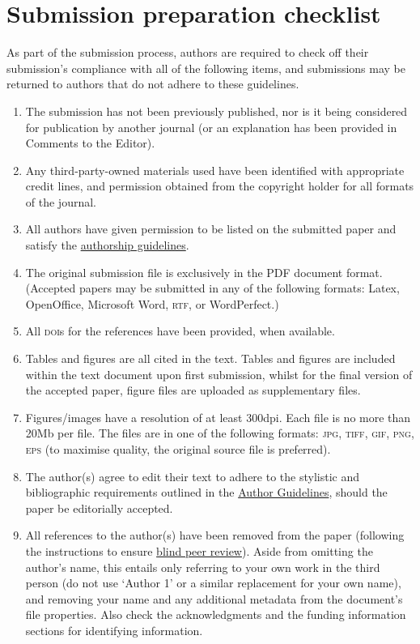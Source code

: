 \documentclass[charis,linguex]{glossa}
\begin{document}
\section{Submission preparation checklist}

As part of the submission process, authors are required to check off their submission's compliance with all of the following items, and submissions may be returned to authors that do not adhere to these guidelines.

\begin{enumerate}[label=\arabic*.]
\item The submission has not been previously published, nor is it being considered for publication by another journal (or an explanation has been provided in Comments to the Editor).
\item Any third-party-owned materials used have been identified with appropriate credit lines, and permission obtained from the copyright holder for all formats of the journal.
\item All authors have given permission to be listed on the submitted paper and satisfy the \href{http://glossa.ubiquitypress.com/about/authorship/}{authorship guidelines}. 
\item The original submission file is exclusively in the PDF document format. (Accepted papers may be submitted in any of the following formats: Latex, OpenOffice, Microsoft Word, \textsc{rtf}, or WordPerfect.)
\item All \textsc{doi}s for the references have been provided, when available.
\item Tables and figures are all cited in the text. Tables and figures are included within the text document upon first submission, whilst for the final version of the accepted paper, figure files are uploaded as supplementary files.
\item Figures/images have a resolution of at least 300dpi. Each file is no more than 20Mb per file. The files are in one of the following formats: \textsc{jpg, tiff, gif, png, eps} (to maximise quality, the original source file is preferred).
\item The author(s) agree to edit their text to adhere to the stylistic and bibliographic requirements outlined in the \href{https://www.glossa-journal.org/about/submissions#authorGuidelines}{Author Guidelines}, should the paper be editorially accepted.
\item All references to the author(s) have been removed from the paper (following the instructions to ensure \href{https://www.glossa-journal.org/help/view/editorial/topic/000044}{blind peer review}). Aside from omitting the author’s name, this entails only referring to your own work in the third person (do not use `Author 1’ or a similar replacement for your own name), and removing your name and any additional metadata from the document’s file properties. Also check the acknowledgments and the funding information sections for identifying information.
\end{enumerate}
\end{document}
